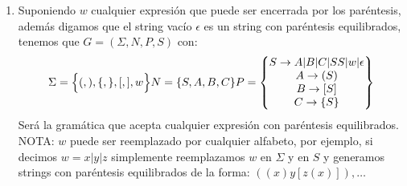 \documentclass[spanish, fleqn]{article}
\begin{document}
\begin{enumerate}
			\item
				Suponiendo $w$ cualquier expresión que puede ser encerrada por
				los paréntesis, además digamos que el string vacío $\epsilon$
				es un string con paréntesis equilibrados, tenemos que
				$G = (\Sigma, N, P, S)$ con:
				\begin{equation*}
					\Sigma = \Big \{(, ), \{, \}, [, ], w \Big \} \\
					N = \{S, A, B, C\} \\
					P =
					\begin{Bmatrix}
						S \rightarrow A|B|C|SS|w|\epsilon \\
						A \rightarrow (S) \\
						B \rightarrow [S] \\
						C \rightarrow \{S\}
					\end{Bmatrix}
				\end{equation*}
				Será la gramática que acepta cualquier expresión con paréntesis
				equilibrados.\\
				NOTA: $w$ puede ser reemplazado por cualquier alfabeto, por
				ejemplo, si decimos $w = x|y|z$ simplemente reemplazamos $w$ en
				$\Sigma$ y en $S$ y generamos strings con paréntesis
				equilibrados de la forma: $((x)y[{z}(x)]),\dots$


\end{enumerate}
\end{document}
